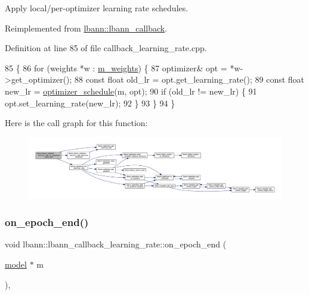 Apply local/per-\/optimizer learning rate schedules. 

Reimplemented from \hyperlink{classlbann_1_1lbann__callback_af183624e63ba65e0003fa988f53dee0c}{lbann\+::lbann\+\_\+callback}.



Definition at line 85 of file callback\+\_\+learning\+\_\+rate.\+cpp.


\begin{DoxyCode}
85                                                                 \{
86   \textcolor{keywordflow}{for} (weights *w : \hyperlink{classlbann_1_1lbann__callback__learning__rate_a0b02e82190e04a22ab26d858041915d7}{m\_weights}) \{
87     optimizer& opt = *w->get\_optimizer();
88     \textcolor{keyword}{const} \textcolor{keywordtype}{float} old\_lr = opt.get\_learning\_rate();
89     \textcolor{keyword}{const} \textcolor{keywordtype}{float} new\_lr = \hyperlink{classlbann_1_1lbann__callback__learning__rate_acf7f3921a68e7f1f772106e18c545345}{optimizer\_schedule}(m, opt);
90     \textcolor{keywordflow}{if} (old\_lr != new\_lr) \{
91       opt.set\_learning\_rate(new\_lr);
92     \}
93   \}
94 \}
\end{DoxyCode}
Here is the call graph for this function\+:\nopagebreak
\begin{figure}[H]
\begin{center}
\leavevmode
\includegraphics[width=350pt]{classlbann_1_1lbann__callback__learning__rate_ab6aa0530604e32a1be2b37f3933f6bf6_cgraph}
\end{center}
\end{figure}
\mbox{\label{classlbann_1_1lbann__callback__learning__rate_ab8eb509bdbea501882d6b248a814bb28}} 
\subsubsection{\texorpdfstring{on\+\_\+epoch\+\_\+end()}{on\_epoch\_end()}}
{\footnotesize\ttfamily void lbann\+::lbann\+\_\+callback\+\_\+learning\+\_\+rate\+::on\+\_\+epoch\+\_\+end (\begin{DoxyParamCaption}\item[{\hyperlink{classlbann_1_1model}{model} $\ast$}]{m }\end{DoxyParamCaption})\hspace{0.3cm}{\ttfamily [override]}, {\ttfamily [virtual]}}

